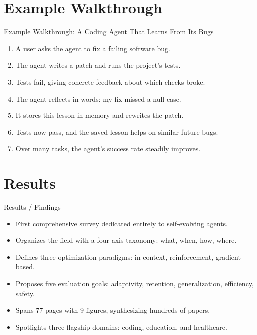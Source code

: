 \documentclass[10pt]{beamer}
\begin{document}
\section{Example Walkthrough}
\begin{frame}[allowframebreaks]{Example Walkthrough: A Coding Agent That Learns From Its Bugs}
\begin{enumerate}
  \item A user asks the agent to fix a failing software bug.
  \item The agent writes a patch and runs the project's tests.
  \item Tests fail, giving concrete feedback about which checks broke.
  \item The agent reflects in words: my fix missed a null case.
  \item It stores this lesson in memory and rewrites the patch.
  \item Tests now pass, and the saved lesson helps on similar future bugs.
  \item Over many tasks, the agent's success rate steadily improves.
\end{enumerate}
\end{frame}
\section{Results}
\begin{frame}[allowframebreaks]{Results / Findings}
\begin{itemize}
  \item First comprehensive survey dedicated entirely to self-evolving agents.
  \item Organizes the field with a four-axis taxonomy: what, when, how, where.
  \item Defines three optimization paradigms: in-context, reinforcement, gradient-based.
  \item Proposes five evaluation goals: adaptivity, retention, generalization, efficiency, safety.
  \item Spans 77 pages with 9 figures, synthesizing hundreds of papers.
  \item Spotlights three flagship domains: coding, education, and healthcare.
\end{itemize}
\end{frame}
\end{document}
